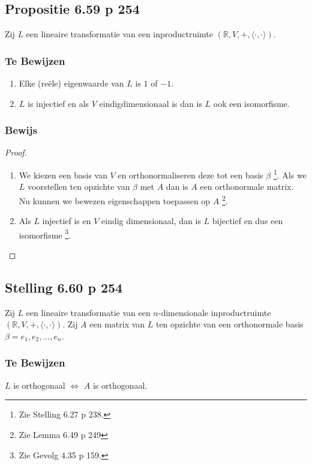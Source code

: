 \documentclass[lineaire_algebra_oplossingen.tex]{subfiles}
\begin{document}
\subsection{Propositie 6.59 p 254}
\label{6.59}
Zij $L$ een lineaire transformatie van een inproductruimte $(\mathbb{R},V,+,\langle \cdot,\cdot \rangle)$.

\subsubsection*{Te Bewijzen}
\begin{enumerate}
\item Elke (re\"ele) eigenwaarde van $L$ is $1$ of $-1$.

\item $L$ is injectief en als $V$ eindigdimensionaal is dan is $L$ ook een isomorfisme.
\end{enumerate}

\subsubsection*{Bewijs}
\begin{proof}
\begin{enumerate}
\item
We kiezen een basis van $V$ en orthonormaliseren deze tot een basis $\beta$ \footnote{Zie Stelling 6.27 p 238.}. Als we $L$ voorstellen ten opzichte van $\beta$ met $A$ dan is $A$ een orthonormale matrix.
Nu kunnen we bewezen eigenschappen toepassen op $A$ \footnote{Zie Lemma 6.49 p 249}.

\item
Als $L$ injectief is en $V$ eindig dimensionaal, dan is $L$ bijectief en dus een isomorfisme \footnote{Zie Gevolg 4.35 p 159.}.
\end{enumerate}
\end{proof}


\subsection{Stelling 6.60 p 254}
\label{6.60}
Zij $L$ een lineaire transformatie van een $n$-dimensionale inproductruimte $(\mathbb{R},V,+,\langle \cdot,\cdot \rangle)$.
Zij $A$ een matrix van $L$ ten opzichte van een orthonormale basis $\beta = e_1,e_2,...,e_n$.

\subsubsection*{Te Bewijzen}
\begin{center}
$L$ is orthogonaal $\Leftrightarrow$ $A$ is orthogonaal.
\end{center}
\end{document}
